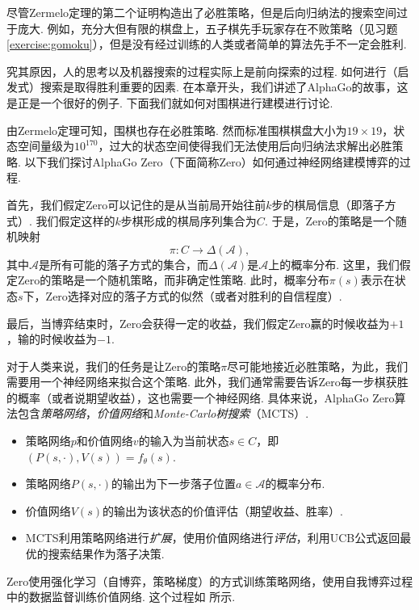 尽管Zermelo定理的第二个证明构造出了必胜策略，但是后向归纳法的搜索空间过于庞大. 例如，充分大但有限的棋盘上，五子棋先手玩家存在不败策略（见习题 \ref{exercise:gomoku}），但是没有经过训练的人类或者简单的算法先手不一定会胜利. 

究其原因，人的思考以及机器搜索的过程实际上是前向探索的过程. 如何进行（启发式）搜索是取得胜利重要的因素. 在本章开头，我们讲述了AlphaGo的故事，这是正是一个很好的例子. 下面我们就如何对围棋进行建模进行讨论.

由Zermelo定理可知，围棋也存在必胜策略. 然而标准围棋棋盘大小为$19\times 19$，状态空间量级为$10^{170}$，过大的状态空间使得我们无法使用后向归纳法求解出必胜策略. 以下我们探讨AlphaGo Zero（下面简称Zero）如何通过神经网络建模博弈的过程.

首先，我们假定Zero可以记住的是从当前局开始往前$k$步的棋局信息（即落子方式）. 我们假定这样的$k$步棋形成的棋局序列集合为$C$. 于是，Zero的策略是一个随机映射
\[\pi: C\to \Delta(\mathcal A),\]
其中$\mathcal A$是所有可能的落子方式的集合，而$\Delta(\mathcal A)$是$\mathcal A$上的概率分布. 这里，我们假定Zero的策略是一个随机策略，而非确定性策略. 此时，概率分布$\pi(s)$表示在状态$s$下，Zero选择对应的落子方式的似然（或者对胜利的自信程度）.

最后，当博弈结束时，Zero会获得一定的收益，我们假定Zero赢的时候收益为$+1$，输的时候收益为$-1$. 

对于人类来说，我们的任务是让Zero的策略$\pi$尽可能地接近必胜策略，为此，我们需要用一个神经网络来拟合这个策略. 此外，我们通常需要告诉Zero每一步棋获胜的概率（或者说期望收益），这也需要一个神经网络. 具体来说，AlphaGo Zero算法包含\textit{策略网络}，\textit{价值网络}和\textit{Monte-Carlo树搜索}（MCTS）.
\begin{itemize}
    \item 策略网络$p$和价值网络$v$的输入为当前状态$s\in C$，即$(P(s,\cdot),V(s))=f_\theta(s)$.
    \item 策略网络$P(s,\cdot)$的输出为下一步落子位置$a\in\mathcal A$的概率分布.
    \item 价值网络$V(s)$的输出为该状态的价值评估（期望收益、胜率）.
    \item MCTS利用策略网络进行\textit{扩展}，使用价值网络进行\textit{评估}，利用UCB公式返回最优的搜索结果作为落子决策.
\end{itemize}

Zero使用强化学习（自博弈，策略梯度）的方式训练策略网络，使用自我博弈过程中的数据监督训练价值网络. 这个过程如 所示.

